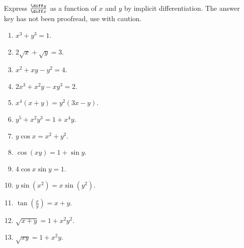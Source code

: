 Express $\frac{\diff y}{\diff x}$ as a function of $x$ and $y$ by implicit differentiation. The answer key has not been proofread, use with caution.
\begin{multicols}{2}
\begin{enumerate}
\item $x^3+y^3=1$.

\item $ 2\sqrt x+\sqrt y=3$.

\item $ x^2+x y-y^2=4$.

\item $ 2x^3+x^2y-x y^3=2$.

\item $ x^4(x+y)=y^2(3x-y)$.

\item $ y^5+x^2y^3=1+x^4y $.

\item $ y\cos x=x^2+y^2 $.

\item $ \cos (x y)=1+\sin y$.

\item $ 4\cos x\sin y=1$.

\item $ y\sin \left(x^2\right)=x\sin \left(y^2\right)$.

\item $ \tan \left(\frac{x}{y}\right)=x+y$.

\item $ \sqrt{x+y}=1+x^2y^2$.

\item $ \sqrt{xy}=1+x^2 y$.


\end{enumerate}
\end{multicols}
